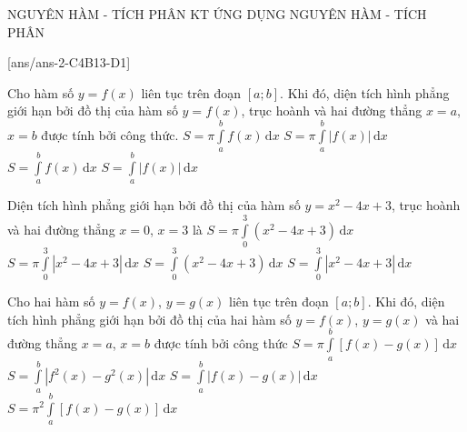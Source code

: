 \begin{name}
	{NGUYÊN HÀM - TÍCH PHÂN}
	{KT ỨNG DỤNG NGUYÊN HÀM - TÍCH PHÂN}
	{\tentruong}
	{\thoigian}
\end{name}
\setcounter{ex}{0}\setcounter{bt}{0}

[ans/ans-2-C4B13-D1]
\TN
\begin{ex}%
	Cho hàm số $y=f(x)$ liên tục trên đoạn $[a;b]$. Khi đó, diện tích hình phẳng giới hạn bởi đồ thị của hàm số $y=f(x)$, trục hoành và hai đường thẳng $x=a$, $x=b$ được tính bởi công thức.
	\choice
	{$S=\pi \displaystyle\int \limits_a^b f(x)\mathrm{\,d}x$}
	{$S=\pi \displaystyle\int \limits_a^b |f(x)|\mathrm{\,d}x$}
	{$S=\displaystyle\int \limits_a^b f(x)\mathrm{\,d}x$}
	{\True $S=\displaystyle\int \limits_a^b |f(x)|\mathrm{\,d}x$}
\end{ex}
\begin{ex}%
	Diện tích hình phẳng giới hạn bởi đồ thị của hàm số $y=x^2-4x+3$, trục hoành và hai đường thẳng $x=0$, $x=3$ là
	\choice
	{$S=\pi \displaystyle\int \limits_0^3 \left(x^2-4x+3\right)\mathrm{\,d}x$}
	{$S=\pi \displaystyle\int \limits_0^3 \left|x^2-4x+3\right|\mathrm{\,d}x$}
	{$S=\displaystyle\int \limits_0^3 \left(x^2-4x+3\right)\mathrm{\,d}x$}
	{\True $S=\displaystyle\int \limits_0^3 \left|x^2-4x+3\right|\mathrm{\,d}x$}
\end{ex}
\begin{ex}%
	Cho hai hàm số $y=f(x)$, $y=g(x)$ liên tục trên đoạn $[a;b]$. Khi đó, diện tích hình phẳng giới hạn bởi đồ thị của hai hàm số $y=f(x)$, $y=g(x)$ và hai đường thẳng $x=a$, $x=b$ được tính bởi công thức
	\choice
	{$S=\pi \displaystyle\int \limits_a^b [f(x)-g(x)]\mathrm{\,d}x$}
	{$S=\displaystyle\int \limits_a^b \left|f^2(x)-g^2(x)\right|\mathrm{\,d}x$}
	{\True $S=\displaystyle\int \limits_a^b |f(x)-g(x)|\mathrm{\,d}x$}
	{$S=\pi ^2\displaystyle\int \limits_a^b [f(x)-g(x)]\mathrm{\,d}x$}
\end{ex}
